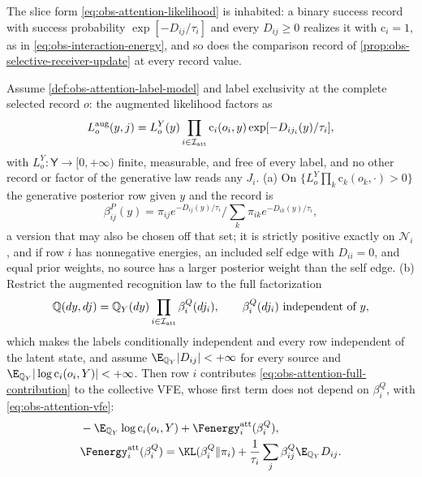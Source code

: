 The slice form \eqref{eq:obs-attention-likelihood} is inhabited: a binary
success record with success probability \(\exp[-D_{ij}/\tau_i]\) and every
\(D_{ij}\ge0\) realizes it with \(\mathrm c_i=1\), as in
\eqref{eq:obs-interaction-energy}, and so does the comparison record of
\cref{prop:obs-selective-receiver-update} at every record value.

Assume \cref{def:obs-attention-label-model} and label exclusivity at the
complete selected record \(o\): the augmented likelihood factors as
\begin{equation}
L_o^{\rm aug}(y,j)
=L_o^Y(y)\prod_{i\in\mathcal I_{\rm att}}
\mathrm c_i(o_i,y)\exp[-D_{ij_i}(y)/\tau_i],
\label{eq:obs-attention-augmented-likelihood}
\end{equation}
with \(L_o^Y:\mathsf Y\to[0,+\infty)\) finite, measurable, and free of every
label, and no other record or factor of the generative law reads any \(J_i\).
(a) On \(\{L_o^Y\prod_k\mathrm c_k(o_k,\cdot)>0\}\) the generative posterior
row given \(y\) and the record is
\begin{equation}
\beta^P_{ij}(y)
=\pi_{ij}e^{-D_{ij}(y)/\tau_i}\Big/\sum_k\pi_{ik}e^{-D_{ik}(y)/\tau_i},
\label{eq:obs-attention-posterior}
\end{equation}
a version that may also be chosen off that set; it is strictly positive
exactly on \(\mathcal N_i\), and if row \(i\) has nonnegative energies, an
included self edge with \(D_{ii}=0\), and equal prior weights, no source has a
larger posterior weight than the self edge. (b) Restrict the augmented
recognition law to the full factorization
\begin{equation}
\mathbb Q(dy,dj)=\mathbb Q_Y(dy)
\prod_{i\in\mathcal I_{\rm att}}\beta_i^Q(dj_i),
\qquad \beta_i^Q(dj_i)\ \text{independent of }y,
\label{eq:obs-attention-recognition-factorization}
\end{equation}
which makes the labels conditionally independent and every row independent of
the latent state, and assume \(\E_{\mathbb Q_Y}|D_{ij}|<+\infty\) for every
source and \(\E_{\mathbb Q_Y}|\log\mathrm c_i(o_i,Y)|<+\infty\). Then row \(i\)
contributes \eqref{eq:obs-attention-full-contribution} to the collective VFE,
whose first term does not depend on \(\beta_i^Q\), with
\eqref{eq:obs-attention-vfe}:
\begin{align}
&-\E_{\mathbb Q_Y}\log\mathrm c_i(o_i,Y)+\Fenergy_i^{\rm att}(\beta_i^Q),
\label{eq:obs-attention-full-contribution}\\
&\Fenergy_i^{\rm att}(\beta^Q_i)
=\KL(\beta^Q_i\Vert\pi_i)
+\frac{1}{\tau_i}\sum_j\beta^Q_{ij}\E_{\mathbb Q_Y}D_{ij}.
\label{eq:obs-attention-vfe}
\end{align}
